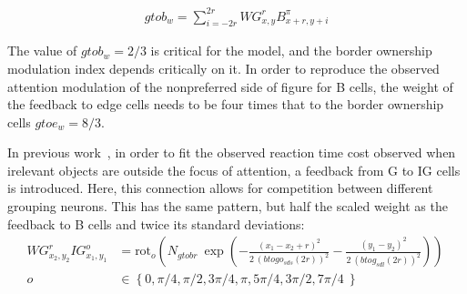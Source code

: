 \begin{align}
	gtob_w=\sum^{2r}_{i=-2r} WG^{r}_{x,y}B^{\pi}_{x+r,y+i}
\end{align}

The value of $gtob_w=2/3$ is critical for the model, and the border ownership modulation index depends critically on it. In order to reproduce the observed attention modulation of the nonpreferred side of figure for B cells, the weight of the feedback to edge cells needs to be four times that to the border ownership cells $gtoe_w=8/3$.

In previous work~\citep{Mihalas_etal11b},
 in order to fit the observed reaction time cost observed when irelevant objects are outside the focus of attention, a feedback
from G to IG cells is introduced. Here, this connection allows for competition between different grouping neurons. This has the same pattern, but half the scaled weight as the
feedback to B cells and twice its standard deviations: 
\begin{align}
	WG^{r}_{x_2,y_2}IG^{o}_{x_1,y_1}&=\text{rot}_{o}\left(N_{gtobr}\: \exp\left(-\frac{(x_1-x_2+r)^2}{2\: (btogo_{sds} (2r))^2}
	-\frac{(y_1-y_2)^2}{2\: (btog_{sdl} (2r))^2}\right)\right) \  \nonumber\\ o&\in \left\{0,\pi/4,\pi/2,3\pi/4,\pi,5\pi/4,3\pi/2,7\pi/4\ \right\} \nonumber\\
\end{align}

